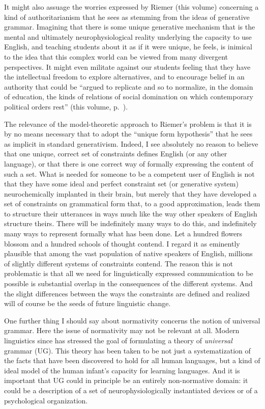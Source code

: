 \documentclass[output=paper]{langscibook}
\begin{document}
It might also assuage the worries expressed by Riemer (this volume) concerning a kind of authoritarianism that he sees as stemming from the ideas of generative grammar. Imagining that there is some unique generative mechanism that is the mental and ultimately neurophysiological reality underlying the capacity to use English, and teaching students about it as if it were unique, he feels, is inimical to the idea that this complex world can be viewed from many divergent perspectives. It might even militate against our students feeling that they have the intellectual freedom to explore alternatives, and to encourage belief in an authority that could be ``argued to replicate and so to normalize, in the domain of education, the kinds of relations of social domination on which contemporary political orders rest'' (this volume, p.~\pageref{q:riemer:domination}).

The relevance of the model-theoretic approach to Riemer's problem is that it is by no means necessary that to adopt the ``unique form hypothesis'' that he sees as implicit in standard generativism. Indeed, I see absolutely no reason to believe that one unique, correct set of constraints defines English (or any other language), or that there is one correct way of formally expressing the content of such a set. What is needed for someone to be a competent user of English is not that they have some ideal and perfect constraint set (or generative system) neurochemically implanted in their brain, but merely that they have developed a set of constraints on grammatical form that, to a good approximation, leads them to structure their utterances in ways much like the way other speakers of English structure theirs. There will be indefinitely many ways to do this, and indefinitely many ways to represent formally what has been done. Let a hundred flowers blossom and a hundred schools of thought contend. I regard it as eminently plausible that among the vast population of native speakers of English, millions of slightly different systems of constraints contend. The reason this is not problematic is that all we need for linguistically expressed communication to be possible is substantial overlap in the consequences of the different systems. And the slight differences between the ways the constraints are defined and realized will of course be the seeds of future linguistic change.

One further thing I should say about normativity concerns the notion of universal grammar. Here the issue of normativity may not be relevant at all. Modern linguistics since \citet{Chomsky65} has stressed the goal of formulating a theory of \emph{universal} grammar (UG).  This theory has been taken to be not just a systematization of the facts that have been discovered to hold for all human languages, but a kind of ideal model of the human infant's capacity for learning languages.  And it is important that UG could in principle be an entirely non-normative domain: it could be a description of a set of neurophysiologically instantiated devices or of a psychological organization.
\end{document}
